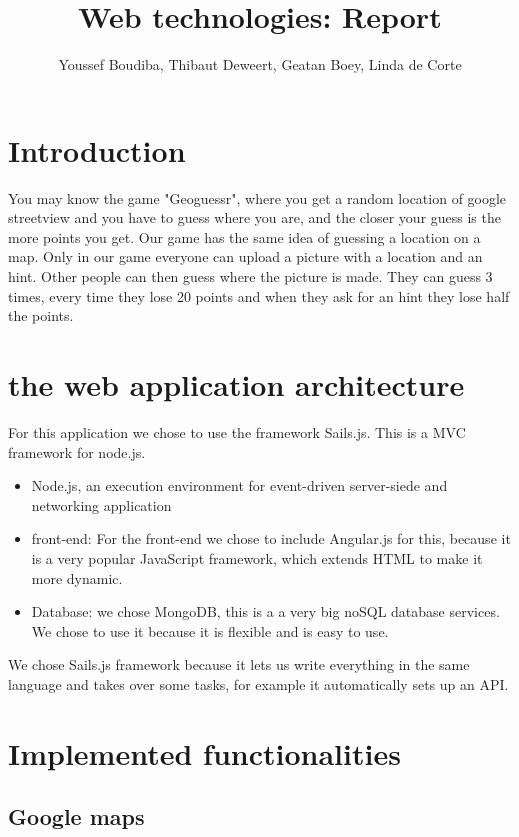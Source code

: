 \documentclass[11pt, oneside]{article}   	%
\title{Web technologies: Report}
\author{Youssef Boudiba, Thibaut Deweert, Geatan Boey, Linda de Corte }
\date{}							%
\begin{document}
\maketitle
\clearpage

\tableofcontents
\clearpage


\section{Introduction}
You may know the game "Geoguessr", where you get a random location of google streetview and you have to guess where you are, and the closer your guess is the more points you get. 
Our game has the same idea of guessing a location on a map. Only in our game everyone can upload a picture with a location and an hint. Other people can then guess where the picture is made. They can guess 3 times, every time they lose 20 points and when they ask for an hint they lose half the points.

\section{ the web application architecture}
For this application we chose to use the framework Sails.js. This is a  MVC framework for node.js. 

\begin{itemize}
\item Node.js, an execution environment for event-driven server-siede and networking application
\item front-end: For the front-end we chose to include Angular.js for this, because it is a very popular JavaScript framework, which extends HTML to make it more dynamic.
\item Database:  we chose MongoDB, this is a a very big noSQL database services. We chose to use it because it is flexible and is easy to use.
\end{itemize}

We chose Sails.js framework because it lets us write everything in the same language and takes over some tasks, for example it automatically sets up an API.


\section{Implemented functionalities}


\subsection{Google maps}





 
\end{document}
